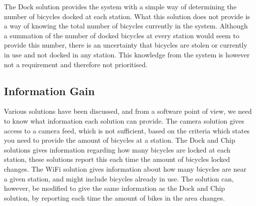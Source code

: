 The Dock solution provides the system with a simple way of determining the number of bicycles docked at each station. What this solution does not provide is a way of knowing the total number of bicycles currently in the system. Although a summation of the number of docked bicycles at every station would seem to provide this number, there is an uncertainty that bicycles are stolen or currently in use and not docked in any station. This knowledge from the system is however not a requirement and therefore not prioritised.

\subsection{Information Gain}
Various solutions have been discussed, and from a software point of view, we need to know what information each solution can provide.
The camera solution gives access to a camera feed, which is not sufficient, based on the criteria which states you need to provide the amount of bicycles at a station.
The Dock and Chip solutions gives information regarding how many bicycles are locked at each station, these solutions report this each time the amount of bicycles locked changes.
The WiFi solution gives information about how many bicycles are near a given station, and might include bicycles already in use.
The solution can, however, be modified to give the same information as the Dock and Chip solution, by reporting each time the amount of bikes in the area changes.

